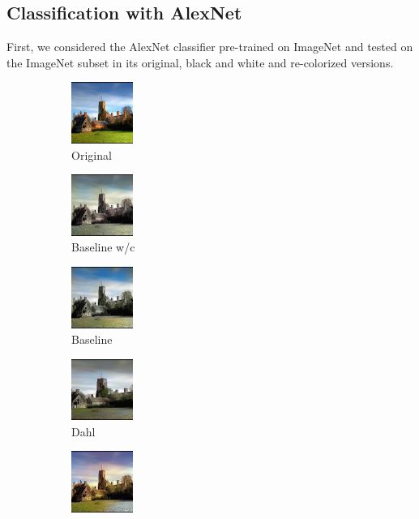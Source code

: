 \subsection{Classification with AlexNet}
First, we considered the AlexNet classifier pre-trained on ImageNet and tested on the ImageNet subset in its original, black and white and re-colorized versions.

\begin{figure}[t]
	\centering
	\captionsetup[subfigure]{labelformat=empty}
	\begin{subfigure}[b]{0.1\textwidth}
		\centering
		\includegraphics[width=2cm]{or - imgnet.jpeg}
		\caption{Original}
	\end{subfigure}
	\hfill
	\begin{subfigure}[b]{0.1\textwidth}
		\includegraphics[width=2cm]{b - imgnet.jpeg}
		\caption{Baseline w/c}
	\end{subfigure}
	\hfill
	\begin{subfigure}[b]{0.1\textwidth}
		\includegraphics[width=2cm]{bw - imgnet.jpeg}
		\caption{Baseline}
	\end{subfigure}
	\hfill
	\begin{subfigure}[b]{0.1\textwidth}
		\includegraphics[width=2cm]{d - imgnet.jpeg}
		\caption{Dahl}
	\end{subfigure}
	\hfill
	\begin{subfigure}[b]{0.1\textwidth}
		\includegraphics[width=2cm]{z - imgnet2.jpeg}

\end{subfigure}
\end{figure}
